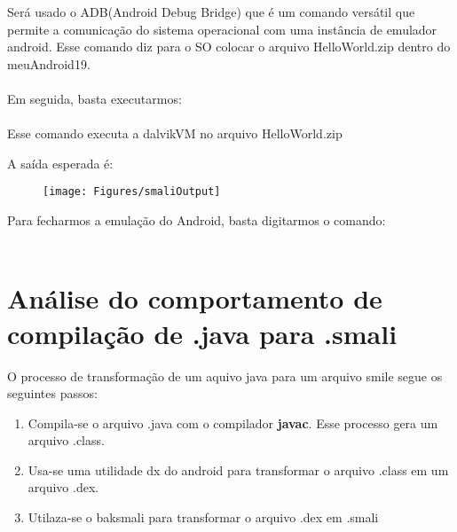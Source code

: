 \documentclass[hidelinks,12pt]{article}
\begin{document}
	Será usado o ADB(Android Debug Bridge) que é um comando versátil que permite a comunicação do sistema operacional com uma instância de emulador android. Esse comando diz para o SO colocar o arquivo HelloWorld.zip dentro do meuAndroid19.\\
	
	\noindent{}\\	
	
	Em seguida, basta executarmos:\\
	
	\noindent{}\\
	
	Esse comando executa a dalvikVM no arquivo HelloWorld.zip
	
	A saída esperada é:
	
	\begin{figure}[!h]
		\centering
		\texttt{[image: Figures/smaliOutput]}
	\end{figure}
	
	Para fecharmos a emulação do Android, basta digitarmos o comando:\\
	
	
	\noindent{}\\
	
	


\section{Análise do comportamento de compilação de .java para .smali}
	
	O processo de transformação de um aquivo java para um arquivo smile segue os seguintes passos:
	
	\begin{enumerate}
		\item Compila-se o arquivo .java com o compilador \textbf{javac}. Esse processo gera um arquivo .class.

		\item Usa-se uma utilidade dx do android para transformar o arquivo .class em um arquivo .dex.
		
		\item Utilaza-se o baksmali para transformar o arquivo .dex em .smali
		
		 
	\end{enumerate}
	
\end{document}
